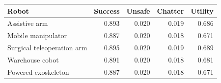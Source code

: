 \begin{tabular}{lrrrr}
\toprule
Robot & Success & Unsafe & Chatter & Utility \\
\midrule
Assistive arm & 0.893 & 0.020 & 0.019 & 0.686 \\
Mobile manipulator & 0.887 & 0.020 & 0.018 & 0.671 \\
Surgical teleoperation arm & 0.895 & 0.020 & 0.019 & 0.689 \\
Warehouse cobot & 0.891 & 0.020 & 0.018 & 0.681 \\
Powered exoskeleton & 0.887 & 0.020 & 0.018 & 0.671 \\
\bottomrule
\end{tabular}
